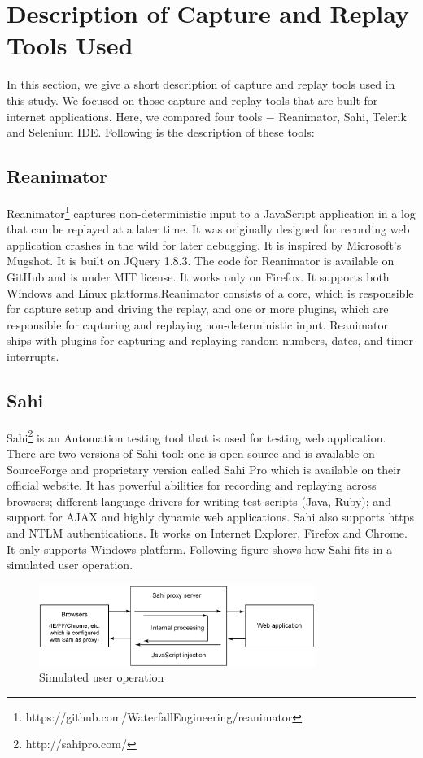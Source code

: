 \documentclass[12pt,journal]{IEEEtran}
\begin{document}
\section{Description of Capture and Replay Tools Used}
In this section, we give a short description of capture and replay tools used in this study. We focused on those capture and replay tools that are built for internet applications. Here, we compared four tools $-$ Reanimator, Sahi, Telerik and Selenium IDE. Following is the description of these tools:
\subsection{Reanimator}
Reanimator\footnote{https://github.com/WaterfallEngineering/reanimator} captures non-deterministic input to a JavaScript application in a log that can be replayed at a later time. It was originally designed for recording web application crashes in the wild for later debugging. It is inspired by Microsoft’s Mugshot. It is built on JQuery 1.8.3. The code for Reanimator is available on GitHub and is under MIT license. It works only on Firefox. It supports both Windows and Linux platforms.Reanimator consists of a core, which is responsible for capture setup and driving the replay, and one or more plugins, which are responsible for capturing and replaying non-deterministic input. Reanimator ships with plugins for capturing and replaying random numbers, dates, and timer interrupts.

\subsection{Sahi}
Sahi\footnote{http://sahipro.com/} is an Automation testing tool that is used for testing web application. There are two versions of Sahi tool: one is open source and is available on SourceForge and proprietary version called Sahi Pro which is available on their official website. It has powerful abilities for recording and replaying across browsers; different language drivers for writing test scripts (Java, Ruby); and support for AJAX and highly dynamic web applications. Sahi also supports https and NTLM authentications. It works on Internet Explorer, Firefox and Chrome. It only supports Windows platform. Following figure shows how Sahi fits in a simulated user operation.
\begin{figure}[h!]
 \hfill\includegraphics[width=9cm]{figures/sahi.PNG}\hspace*{\fill}
 \caption{Simulated user operation}
 \label{fig}
\end{figure}
\end{document}
